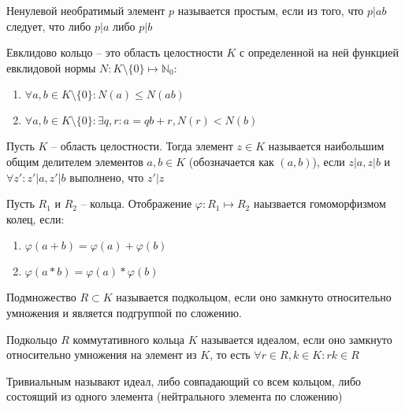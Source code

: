 \documentclass{article}
\begin{document}
\begin{definition}
    Ненулевой необратимый элемент $p$ называется простым, если из того, что $p | ab$ следует, что либо $p | a$ либо $p |
    b$
\end{definition}

\begin{definition}
    Евклидово кольцо -- это область целостности $K$ с определенной на ней функцией евклидовой нормы $N: K \setminus
    \{0\} \mapsto \mathbb{N}_0$:
    \begin{enumerate}
        \item $\forall a, b \in K \setminus \{0\}: N(a) \leq N(ab)$
        \item $\forall a, b \in K \setminus \{0\}: \exists q, r: a = qb + r, N(r) < N(b)$
    \end{enumerate}
\end{definition}

\begin{definition}
    Пусть $K$ -- область целостности. Тогда элемент $z \in K$ называется наибольшим общим делителем элементов $a, b \in
    K$ (обозначается как $(a, b)$), если $z|a, z|b$ и $\forall z': z'|a, z'|b$ выполнено, что  $z'|z$
\end{definition}

\begin{definition}
    Пусть $R_1$ и $R_2$ -- кольца. Отображение $\varphi: R_1 \mapsto R_2$ наызвается гомоморфизмом колец, если:
    \begin{enumerate}
        \item $\varphi(a+b) = \varphi(a) + \varphi(b)$
        \item $\varphi(a*b) = \varphi(a) * \varphi(b)$
    \end{enumerate}
\end{definition}

\begin{definition}
    Подмножество $R \subset K$ называется подкольцом, если оно замкнуто относительно умножения и является подгруппой по
    сложению.
\end{definition}

\begin{definition}
    Подкольцо $R$ коммутативного кольца $K$ называется идеалом, если оно замкнуто относительно умножения на элемент из
    $K$, то есть $\forall r \in R, k \in K: rk \in R$
\end{definition}

\begin{definition}
    Тривиальным называют идеал, либо совпадающий со всем кольцом, либо состоящий из одного элемента (нейтрального
    элемента по сложению)
\end{definition}
\end{document}
